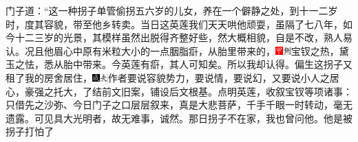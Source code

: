门子道：“这一种拐子单管偷拐五六岁的儿女，养在一个僻静之处，到十一二岁时，度其容貌，带至他乡转卖。当日这英莲我们天天哄他顽耍，虽隔了七八年，如今十二三岁的光景，其模样虽然出脱得齐整好些，然大概相貌，自是不改，熟人易认。况且他眉心中原有米粒大小的一点胭脂㾵，从胎里带来的，{{{\includegraphics[width=3mm]{../Images/00002}\includegraphics[width=3mm]{../Images/00011}\footnotesize \kaishu 宝钗之热，黛玉之怯，悉从胎中带来。今英莲有㾵，其人可知矣。}}}所以我却认得。偏生这拐子又租了我的房舍居住，{\includegraphics[width=3mm]{../Images/00005}\includegraphics[width=3mm]{../Images/00012}\footnotesize \kaishu 作者要说容貌势力，要说情，要说幻，又要说小人之居心，豪强之托大，了结前文旧案，铺设后文根基。点明英莲，收叙宝钗等项诸事：只借先之沙弥、今日门子之口层层叙来，真是大悲菩萨，千手千眼一时转动，毫无遗露。可见具大光明者，故无难事，诚然。}那日拐子不在家，我也曾问他。他是被拐子打怕了
